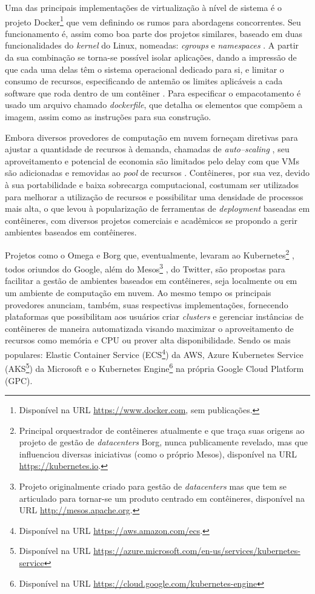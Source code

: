 \documentclass[english,brazilian]{UNISINOSmonografia} %
\begin{document}
Uma das principais implementações de virtualização à nível de sistema é o projeto Docker\footnote{
	Disponível na URL \url{https://www.docker.com}, sem publicações.
} que vem definindo os rumos para abordagens concorrentes.
Seu funcionamento é, assim como boa parte dos projetos similares, baseado em duas funcionalidades do \textit{kernel} do Linux, nomeadas: \textit{cgroups} e \textit{namespaces} \cite{Pahl2015a}.
A partir da sua combinação se torna-se possível isolar aplicações, dando a impressão de que cada uma delas têm o sistema operacional dedicado para si, e limitar o consumo de recursos, especificando de antemão os limites aplicáveis a cada software que roda dentro de um contêiner \cite{Tosatto2015}.
Para especificar o empacotamento é usado um arquivo chamado \textit{dockerfile}, que detalha os elementos que compõem a imagem, assim como as instruções para sua construção.



Embora diversos provedores de computação em nuvem forneçam diretivas para ajustar a quantidade de recursos à demanda, chamadas de \textit{auto--scaling} \cite{Mao2011}, seu aproveitamento e potencial de economia são limitados pelo delay com que VMs são adicionadas e removidas ao \textit{pool} de recursos \cite{Shankar2018}.
Contêineres, por sua vez, devido à sua portabilidade e baixa sobrecarga computacional, costumam ser utilizados para melhorar a utilização de recursos e possibilitar uma densidade de processos mais alta, o que levou à popularização de ferramentas de \textit{deployment} baseadas em contêineres, com diversos projetos comerciais e acadêmicos se propondo a gerir ambientes baseados em contêineres.



Projetos como o Omega \cite{Schwarzkopf2013} e Borg \cite{Verma2015} que, eventualmente, levaram ao Kubernetes\footnote{
	Principal orquestrador de contêineres atualmente e que traça suas origens ao projeto de gestão de \textit{datacenters} Borg, nunca publicamente revelado, mas que influenciou diversas iniciativas (como o próprio Mesos), disponível na URL \url{https://kubernetes.io}.
} \cite{Burns2016}, todos oriundos do Google, além do Mesos\footnote{
	Projeto originalmente criado para gestão de \textit{datacenters} mas que tem se articulado para tornar-se um produto centrado em contêineres, disponível na URL \url{http://mesos.apache.org}.
} \cite{Hindman2011}, do Twitter, são propostas para facilitar a gestão de ambientes baseados em contêineres, seja localmente ou em um ambiente de computação em nuvem.
Ao mesmo tempo os principais provedores anunciam, também, suas respectivas implementações, fornecendo plataformas que possibilitam aos usuários criar \textit{clusters} e gerenciar instâncias de contêineres de maneira automatizada visando maximizar o aproveitamento de recursos como memória e CPU ou prover alta disponibilidade. Sendo os mais populares: Elastic Container Service (ECS\footnote{
	Disponível na URL \url{https://aws.amazon.com/ecs}.
}) da AWS, Azure Kubernetes Service (AKS\footnote{
	Disponível na URL \url{https://azure.microsoft.com/en-us/services/kubernetes-service}
}) da Microsoft e o Kubernetes Engine\footnote{
	Disponível na URL \url{https://cloud.google.com/kubernetes-engine}
} na própria Google Cloud Platform (GPC).
\end{document}
